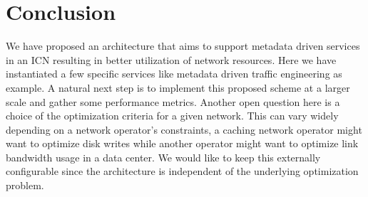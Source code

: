 \documentclass[conference]{IEEEtran}
\begin{document}
\section{Conclusion}
\label{sec:conclusion}
We have proposed an architecture that aims to support metadata
driven services in an ICN resulting in better utilization of network resources. Here we have instantiated a few specific
services like metadata driven traffic engineering as example.
A natural next step is to implement this proposed scheme at
a larger scale and gather some performance metrics. Another
open question here is a choice of the optimization criteria for a
given network. This can vary widely depending on a network
operator’s constraints, a caching network operator might want
to optimize disk writes while another operator might want to
optimize link bandwidth usage in a data center. We would
like to keep this externally configurable since the architecture
is independent of the underlying optimization problem.


\end{document}
